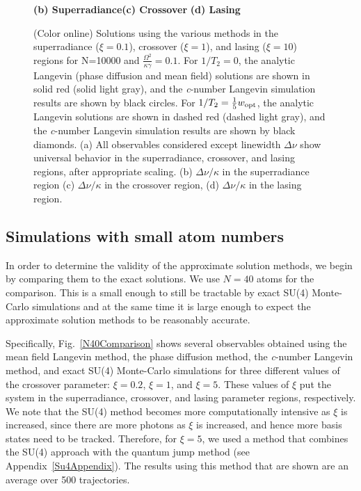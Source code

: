 \documentclass[aps,
twocolumn,
showpacs,
superscriptaddress,groupedaddress]{revtex4}
\begin{document}
\begin{figure}
\begin{center}
	\hspace{-10mm}\textbf{(b) Superradiance}\hspace{33mm}\textbf{(c) Crossover}
  \hspace{37mm}\textbf{(d) Lasing}
\end{center}
		\vspace{-5mm}
\caption{(Color online) Solutions using the various methods in the
superradiance ($\xi=0.1$), crossover ($\xi=1$), and lasing ($\xi=10$)
regions for N=10000 and $\frac{\Omega^2}{\kappa \gamma}=0.1$. For
$1/T_2=0$, the analytic Langevin (phase diffusion and mean field)
solutions are shown in solid red (solid light gray), and the
{\it c}-number Langevin simulation results are shown by black circles.
For $1/T_2=\frac{1}{5} w_{\rm opt}$, the analytic Langevin solutions are
shown in dashed red (dashed light gray), and the {\it
c}-number Langevin simulation results are shown by black diamonds. (a)
All observables considered except linewidth  $\Delta \nu$ show universal
behavior in the superradiance, crossover, and lasing regions, after
appropriate scaling.  (b)  $\Delta \nu / \kappa$ in the superradiance
region (c) $\Delta \nu / \kappa$ in the crossover region, (d) $\Delta
\nu / \kappa$ in the lasing region.}
 \label{N10000Comparison}
\end{figure}


\subsection{Simulations with small atom numbers}

In order to determine the validity of the approximate solution methods,
we begin by comparing them to the exact solutions.  We use $N=40$ atoms
for the comparison.  This is a small enough to still be tractable by
exact SU(4) Monte-Carlo simulations and at the same time it is large
enough to expect the approximate solution methods to be reasonably
accurate. 

Specifically, Fig.~\ref{N40Comparison} shows several observables
obtained using the mean field Langevin method, the phase diffusion
method, the {\it c}-number Langevin method, and exact SU(4)
Monte-Carlo simulations for three different values of the crossover parameter:
$\xi=0.2$, $\xi=1$, and $\xi=5$. These values of $\xi$ put the system in the
superradiance, crossover, and lasing parameter regions, respectively.
We note that the SU(4) method becomes more computationally intensive as $\xi$ is increased, since there are more photons as $\xi$ is increased, and hence
more basis states need to be tracked. Therefore, for $\xi=5$, we used a
method that combines the SU(4) approach with the quantum jump method (see Appendix~\ref{Su4Appendix}). The results using this method that are shown are an average over 500 trajectories.
\end{document}
